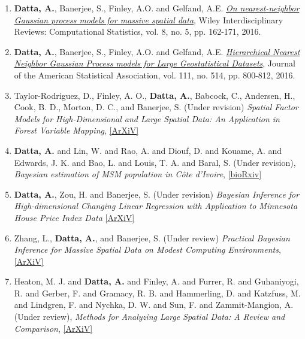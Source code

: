 \documentclass[11pt,a4paper,sans]{moderncv} %
\begin{document}
{\begin{enumerate}
\item \vskip 4mm \textbf {Datta, A.}, Banerjee, S., Finley, A.O. and Gelfand, A.E.  \href{http://onlinelibrary.wiley.com/doi/10.1002/wics.1383/abstract}{\em On nearest-neighbor Gaussian process models for massive spatial data}, Wiley Interdisciplinary Reviews: Computational Statistics, vol. 8, no. 5, pp. 162-171, 2016.

\item \vskip 4mm \textbf {Datta, A.}, Banerjee, S., Finley, A.O. and Gelfand, A.E.  \href{http://www.tandfonline.com/doi/abs/10.1080/01621459.2015.1044091}{\em Hierarchical Nearest Neighbor Gaussian Process models for Large Geostatistical Datasets}, Journal of the American Statistical Association, vol. 111, no. 514, pp. 800-812, 2016.

\item \vskip 4mm Taylor-Rodriguez, D., Finley, A. O.,  \textbf{Datta, A.}, Babcock, C., Andersen, H., Cook, B. D., Morton, D. C.,  and Banerjee, S. (Under revision) {\em Spatial Factor Models for High-Dimensional and Large Spatial Data: An Application in Forest Variable Mapping}, \href{https://arxiv.org/pdf/1801.02078.pdf}{[ArXiV]}

\item \vskip 4mm \textbf{Datta, A.} and Lin, W. and Rao, A. and Diouf, D. and Kouame, A. and Edwards, J. K. and Bao, L. and Louis, T. A. and Baral, S. (Under revision), {\em Bayesian estimation of MSM population in C{\^o}te d'Ivoire}, \href{https://www.biorxiv.org/content/early/2017/11/10/213926.full.pdf}{[bioRxiv]}

\item \vskip 4mm \textbf{Datta, A.}, Zou, H. and Banerjee, S. (Under revision) {\em Bayesian Inference for High-dimensional Changing Linear Regression with Application to Minnesota House Price Index Data}  \href{https://arxiv.org/pdf/1510.07129.pdf}{[ArXiV]}

\item \vskip 4mm Zhang, L., \textbf{Datta, A.}, and Banerjee, S. (Under review) {\em Practical Bayesian Inference for Massive Spatial Data on Modest Computing Environments}, \href{https://arxiv.org/pdf/1802.00495.pdf}{[ArXiV]}

\item \vskip 4mm Heaton, M. J. and \textbf{Datta, A.} and Finley, A. and Furrer, R. and Guhaniyogi, R. and Gerber, F. and Gramacy, R. B. and Hammerling, D. and Katzfuss, M. and Lindgren, F. and Nychka, D. W. and Sun, F. and Zammit-Mangion, A. (Under review), {\em Methods for Analyzing Large Spatial Data: A Review and Comparison}, \href{https://arxiv.org/pdf/1710.05013.pdf}{[ArXiV]}


\end{enumerate}}
\end{document}
